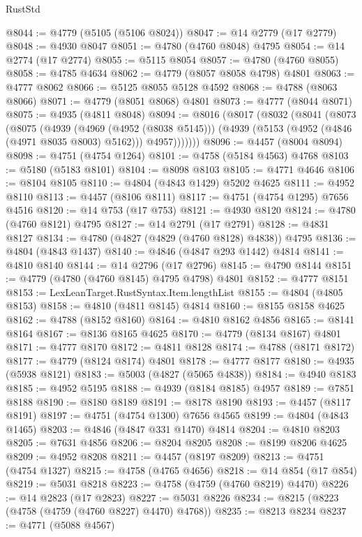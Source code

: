 \begin{lexlean}{RustStd}
\begin{coremodule}
@8044 := @4779 (@5105 (@5106 @8024))
@8047 := @14 @2779 (@17 @2779)
@8048 := @4930 @8047
@8051 := @4780 (@4760 @8048) @4795
@8054 := @14 @2774 (@17 @2774)
@8055 := @5115 @8054
@8057 := @4780 (@4760 @8055)
@8058 := @4785 @4634
@8062 := @4779 (@8057 @8058 @4798) @4801
@8063 := @4777 @8062
@8066 := @5125 @8055 @5128 @4592
@8068 := @4788 (@8063 @8066)
@8071 := @4779 (@8051 @8068) @4801
@8073 := @4777 (@8044 @8071)
@8075 := @4935 (@4811 @8048)
@8094 := @8016
    (@8017
      (@8032
        (@8041
          (@8073
            (@8075
              (@4939
                (@4969 (@4952 (@8038 @5145)))
                (@4939 (@5153 (@4952 (@4846 (@4971 @8035 @8003) @5162))) @4957)))))))
@8096 := @4457 (@8004 @8094)
@8098 := @4751 (@4754 @1264)
@8101 := @4758 (@5184 @4563) @4768
@8103 := @5180 (@5183 @8101)
@8104 := @8098 @8103
@8105 := @4771 @4646
@8106 := @8104 @8105
@8110 := @4804 (@4843 @1429) @5202 @4625
@8111 := @4952 @8110
@8113 := @4457 (@8106 @8111)
@8117 := @4751 (@4754 @1295) @7656 @4516
@8120 := @14 @753 (@17 @753)
@8121 := @4930 @8120
@8124 := @4780 (@4760 @8121) @4795
@8127 := @14 @2791 (@17 @2791)
@8128 := @4831 @8127
@8134 := @4780 (@4827 (@4829 (@4760 @8128) @4838)) @4795
@8136 := @4804 (@4843 @1437)
@8140 := @4846 (@4847 @293 @1442) @4814
@8141 := @4810 @8140
@8144 := @14 @2796 (@17 @2796)
@8145 := @4790 @8144
@8151 := @4779 (@4780 (@4760 @8145) @4795 @4798) @4801
@8152 := @4777 @8151
@8153 := LexLeanTarget.RustSyntax.Item.lengthList
@8155 := @4804 (@4805 @8153)
@8158 := @4810 (@4811 @8145) @4814
@8160 := @8155 @8158 @4625
@8162 := @4788 (@8152 @8160)
@8164 := @4810 @8162 @4856
@8165 := @8141 @8164
@8167 := @8136 @8165 @4625
@8170 := @4779 (@8134 @8167) @4801
@8171 := @4777 @8170
@8172 := @4811 @8128
@8174 := @4788 (@8171 @8172)
@8177 := @4779 (@8124 @8174) @4801
@8178 := @4777 @8177
@8180 := @4935 (@5938 @8121)
@8183 := @5003 (@4827 (@5065 @4838))
@8184 := @4940 @8183
@8185 := @4952 @5195
@8188 := @4939 (@8184 @8185) @4957
@8189 := @7851 @8188
@8190 := @8180 @8189
@8191 := @8178 @8190
@8193 := @4457 (@8117 @8191)
@8197 := @4751 (@4754 @1300) @7656 @4565
@8199 := @4804 (@4843 @1465)
@8203 := @4846 (@4847 @331 @1470) @4814
@8204 := @4810 @8203
@8205 := @7631 @4856
@8206 := @8204 @8205
@8208 := @8199 @8206 @4625
@8209 := @4952 @8208
@8211 := @4457 (@8197 @8209)
@8213 := @4751 (@4754 @1327)
@8215 := @4758 (@4765 @4656)
@8218 := @14 @854 (@17 @854)
@8219 := @5031 @8218
@8223 := @4758 (@4759 (@4760 @8219) @4470)
@8226 := @14 @2823 (@17 @2823)
@8227 := @5031 @8226
@8234 := @8215 (@8223 (@4758 (@4759 (@4760 @8227) @4470) @4768))
@8235 := @8213 @8234
@8237 := @4771 (@5088 @4567)

\end{coremodule}
\end{lexlean}
